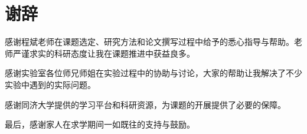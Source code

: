 \chapter*{谢辞}

感谢程斌老师在课题选定、研究方法和论文撰写过程中给予的悉心指导与帮助。老师严谨求实的科研态度让我在课题推进中获益良多。

感谢实验室各位师兄师姐在实验过程中的协助与讨论，大家的帮助让我解决了不少实验中遇到的实际问题。

感谢同济大学提供的学习平台和科研资源，为课题的开展提供了必要的保障。

最后，感谢家人在求学期间一如既往的支持与鼓励。
